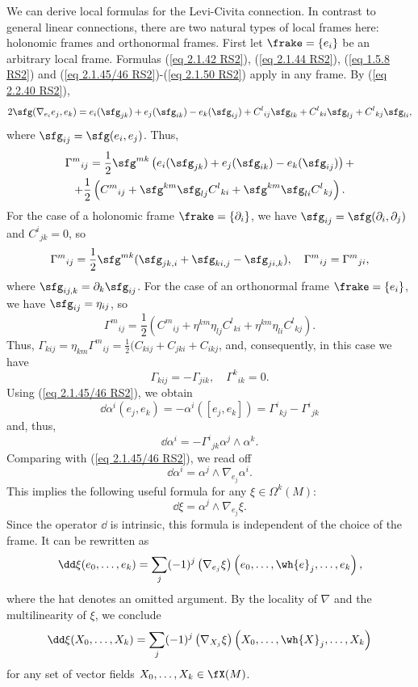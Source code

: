 \begin{rem}
    We can derive local formulas for the Levi-Civita connection. In contrast to general linear connections, there are two natural types of local frames here: holonomic frames and orthonormal frames. First let $\frake=\{e_i\}$ be an arbitrary local frame. Formulas (\ref{eq 2.1.42 RS2}), (\ref{eq 2.1.44 RS2}), (\ref{eq 1.5.8 RS2}) and (\ref{eq 2.1.45/46 RS2})-(\ref{eq 2.1.50 RS2}) apply in any frame. By (\ref{eq 2.2.40 RS2}),
    \[2\sfg(\nabla_{e_i}e_j,e_k)=e_i(\sfg_{jk})+e_j(\sfg_{ik})-e_k(\sfg_{ij})+C^l{}_{ij}\sfg_{lk}+C^l{}_{ki}\sfg_{lj}+C^l{}_{kj}\sfg_{li},\]
    where $\sfg_{ij}=\sfg(e_i,e_j)$. Thus, 
    \begin{multline}
        \Gamma^m{}_{ij}=\frac12\sfg^{mk}\left(e_i(\sfg_{jk})+e_j(\sfg_{ik})-e_k(\sfg_{ij})\right)+\\
        +\frac12\left(C^m{}_{ij}+\sfg^{km}\sfg_{lj}C^l{}_{ki}+\sfg^{km}\sfg_{li}C^l{}_{kj}\right).\label{eq 2.2.41 RS2}
    \end{multline}
    For the case of a holonomic frame $\frake=\{\partial_i\}$, we have $\sfg_{ij}=\sfg(\partial_i,\partial_j)$ and $C^i{}_{jk}=0$, so 
    \[\Gamma^m{}_{ij}=\frac12\sfg^{mk}(\sfg_{jk,i}+\sfg_{ki,j}-\sfg_{ji,k}),\quad \Gamma^m{}_{ij}=\Gamma^m{}_{ji},\]
    where $\sfg_{ij,k}=\partial_k\sfg_{ij}$. For the case of an orthonormal frame $\frake=\{e_i\}$, we have $\sfg_{ij}=\eta_{ij}$, so 
    \[\Gamma^m{}_{ij}=\frac12\left(C^m{}_{ij}+\eta^{km}\eta_{lj}C^l{}_{ki}+\eta^{km}\eta_{li}C^l{}_{kj}\right).\]
    Thus, $\Gamma_{kij}=\eta_{km}\Gamma^m{}_{ij}=\frac12(C_{kij}+C_{jki}+C_{ikj}$, and, consequently, in this case we have 
    \[\Gamma_{kij}=-\Gamma_{jik},\quad \Gamma^k{}_{ik}=0.\]
    Using (\ref{eq 2.1.45/46 RS2}), we obtain 
    \[\dd\alpha^i(e_j,e_k)=-\alpha^i([e_j,e_k])=\Gamma^i{}_{kj}-\Gamma^i{}_{jk}\]
    and, thus,
    \[\dd\alpha^i=-\Gamma^i{}_{jk}\alpha^j\wedge\alpha^k.\]
    Comparing with (\ref{eq 2.1.45/46 RS2}), we read off 
    \[\dd\alpha^i=\alpha^j\wedge \nabla_{e_j}\alpha^i.\]
    This implies the following useful formula for any $\xi\in\Omega^k(M)$:
    \[\dd\xi=\alpha^j\wedge\nabla_{e_j}\xi.\label{eq 2.2.47 RS2}\]
    Since the operator $\dd$ is intrinsic, this formula is independent of the choice of the frame. It can be rewritten as 
    \[\dd\xi(e_0,\ldots,e_k)=\sum_j (-1)^j\left(\nabla_{e_j}\xi\right)\left(e_0,\ldots,\wh{e}_j,\ldots,e_k\right),\]
    where the hat denotes an omitted argument. By the locality of $\nabla$ and the multilinearity of $\xi$, we conclude 
    \[\dd\xi(X_0,\ldots,X_k)=\sum_j (-1)^j\left(\nabla_{X_j}\xi\right)\left(X_0,\ldots,\wh{X}_j,\ldots,X_k\right)\label{eq 2.2.49 RS2}\]
    for any set of vector fields $X_0,\ldots,X_k\in\fX(M)$.
\end{rem}


